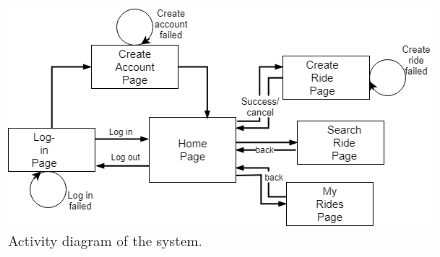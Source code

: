 \documentclass{article}
\begin{document}
\begin{figure}
  \centering
  \includegraphics[scale=0.6]{forSRS.png}
  \caption{Activity diagram of the system.}
  \label{fig:activity}
\end{figure}
\end{document}
